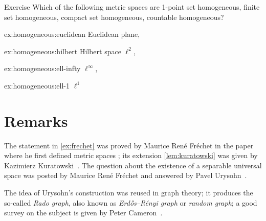 \begin{thm}{Exercise}\label{ex:homogeneous}
Which of the following metric spaces are 
1-point set homogeneous, finite set homogeneous, compact set homogeneous, countable homogeneous?

\begin{subthm}{ex:homogeneous:euclidean}
Euclidean plane,
\end{subthm}

\begin{subthm}{ex:homogeneous:hilbert}
 Hilbert space $\ell^2$,
\end{subthm}

\begin{subthm}{ex:homogeneous:ell-infty}
 $\ell^\infty$,
\end{subthm}

\begin{subthm}{ex:homogeneous:ell-1}
 $\ell^1$
\end{subthm}
\end{thm}


\section{Remarks}

The statement in \ref{ex:frechet} was proved by Maurice René Fréchet in the paper where he first defined metric spaces \cite{frechet};
its extension \ref{lem:kuratowski} was given by Kazimierz Kuratowski~\cite{kuratowski}.
The question about the existence of a separable universal space was posted by Maurice René Fréchet and answered by
Pavel Urysohn~\cite{urysohn}.

The idea of Urysohn's construction was reused in graph theory; it produces the so-called {}\emph{Rado graph},
also known as {}\emph{Erd\H{o}s–R\'enyi graph} or \emph{random graph}; a good survey on the subject is given by Peter Cameron~\cite{cameron}.

